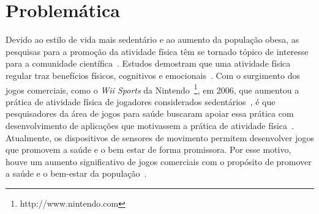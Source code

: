 %
%
%

\section{Problemática}\label{section:problematica}


Devido ao estilo de vida mais sedentário e ao aumento da população obesa, as pesquisas para a promoção da atividade física têm se tornado tópico de interesse para a comunidade científica~\cite{maitland2009,bartolome11,Mandryk2014}. Estudos demostram que uma atividade física regular traz benefícios físicos, cognitivos e emocionais~\cite{Mandryk2014}. Com o surgimento dos jogos comerciais, como o \textit{Wii Sports} da Nintendo~\footnote{http://www.nintendo.com}, em 2006, que aumentou a prática de atividade física de jogadores considerados sedentários~\cite{wiigraves2008}, é que pesquisadores da área de jogos para saúde buscaram apoiar essa prática com desenvolvimento de aplicações que motivassem a prática de atividade física~\cite{stacey2011}. Atualmente, os dispositivos de sensores de movimento permitem desenvolver jogos que promovem a saúde e o bem estar de forma promissora. Por esse motivo, houve um aumento significativo de jogos comerciais com o propósito de promover a saúde e o bem-estar da população~\cite{Papastergiou:2009:EPC:1570538.1570707}.


